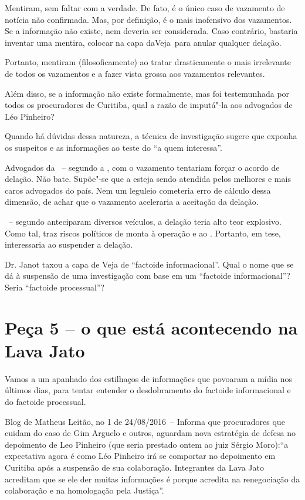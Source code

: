 Mentiram, sem faltar com a verdade. De fato, é o único caso de vazamento
de notícia não confirmada. Mas, por definição, é o mais inofensivo dos
vazamentos. Se a informação não existe, nem deveria ser considerada.
Caso contrário, bastaria inventar uma mentira, colocar na capa
daVeja~para anular qualquer delação.

Portanto, mentiram (filosoficamente) ao tratar drasticamente o mais
irrelevante de todos os vazamentos e a fazer vista grossa aos vazamentos
relevantes.

Além disso, se a informação não existe formalmente, mas foi testemunhada
por todos os procuradores de Curitiba, qual a razão de imputá"-la aos
advogados de Léo Pinheiro?

Quando há dúvidas dessa natureza, a técnica de investigação sugere que
exponha os suspeitos e as informações ao teste do ``a quem interessa''.

Advogados da ~-- segundo a , com o vazamento tentariam forçar o
acordo de delação. Não bate. Supõe"-se que a  esteja sendo atendida
pelos melhores e mais caros advogados do país. Nem um leguleio cometeria
erro de cálculo dessa dimensão, de achar que o vazamento aceleraria a
aceitação da delação.

~-- segundo anteciparam diversos veículos, a delação teria alto teor
explosivo. Como tal, traz riscos políticos de monta à operação e ao .
Portanto, em tese, interessaria ao  suspender a delação.

Dr. Janot taxou a capa de Veja de ``factoide informacional''. Qual o
nome que se dá à suspensão de uma investigação com base em um ``factoide
informacional''? Seria ``factoide processual''?

\section{Peça 5 -- o que está acontecendo na Lava Jato}

Vamos a um apanhado dos estilhaços de informações que povoaram a mídia
nos últimos dias, para tentar entender o desdobramento do factoide
informacional e do factoide processual.

Blog de Matheus Leitão, no 1 de 24/\allowbreak{}08/\allowbreak{}2016~-- Informa que procuradores
que cuidam do caso de Gim Arguelo e outros, aguardam nova estratégia de
defesa no depoimento de Leo Pinheiro (que seria prestado ontem ao juiz
Sérgio Moro):``a expectativa agora é como Léo Pinheiro irá se comportar
no depoimento em Curitiba após a suspensão de sua colaboração.
Integrantes da Lava Jato acreditam que se ele der muitas informações é
porque acredita na renegociação da colaboração e na homologação pela
Justiça''.

